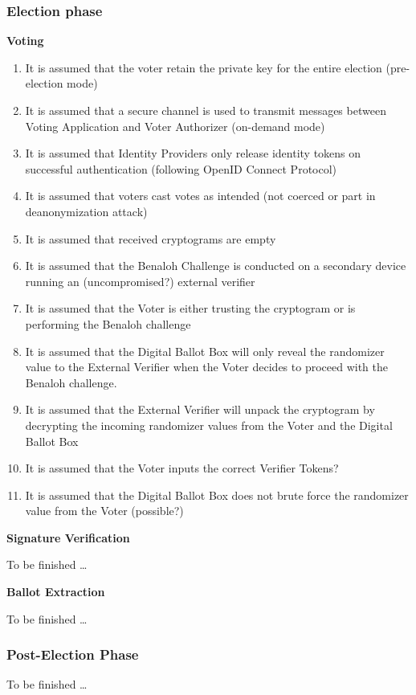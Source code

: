 \subsubsection{Election phase} 

\textbf{Voting}

\begin{enumerate}
\item It is assumed that the voter retain the private key for the entire election (pre-election mode)
\item It is assumed that a secure channel is used to transmit messages between Voting Application and Voter Authorizer (on-demand mode)
\item It is assumed that Identity Providers only release identity tokens on successful authentication (following OpenID Connect Protocol)
\item It is assumed that voters cast votes as intended (not coerced or part in deanonymization attack)
\item It is assumed that received cryptograms are empty
\item It is assumed that the Benaloh Challenge is conducted on a secondary device running an (uncompromised?) external verifier
\item It is assumed that the Voter is either trusting the cryptogram or is performing the Benaloh challenge
\item It is assumed that the Digital Ballot Box will only reveal the randomizer value to the External Verifier when the Voter decides to proceed with the Benaloh challenge.
\item It is assumed that the External Verifier will unpack the cryptogram by decrypting the incoming randomizer values from the Voter and the Digital Ballot Box
\item It is assumed that the Voter inputs the correct Verifier Tokens?
\item It is assumed that the Digital Ballot Box does not brute force the randomizer value from the Voter (possible?)
\end{enumerate}

\textbf{Signature Verification}

To be finished …

\textbf{Ballot Extraction}

To be finished …


\subsubsection{Post-Election Phase} 
To be finished …
